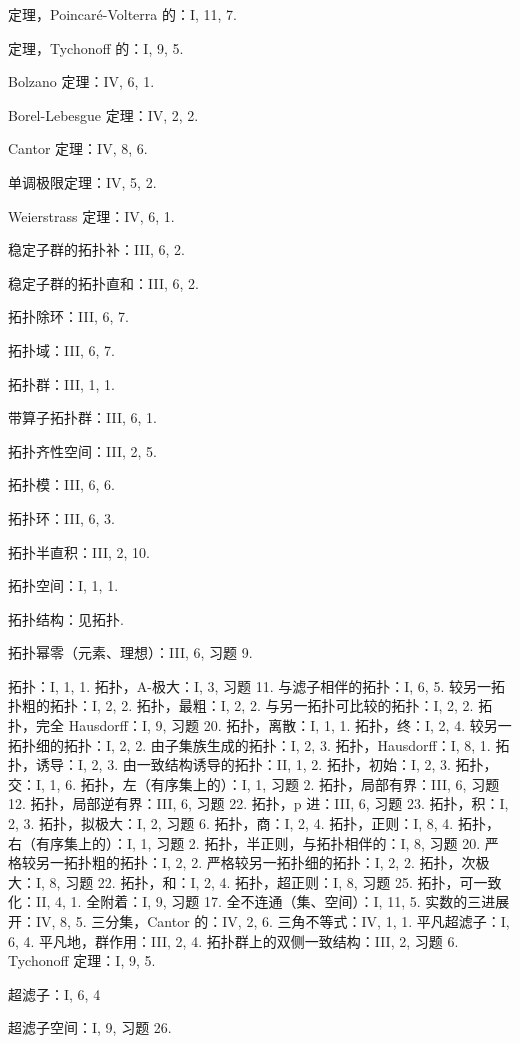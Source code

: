 定理，Poincaré-Volterra 的：I, 11, 7.

定理，Tychonoff 的：I, 9, 5.

Bolzano 定理：IV, 6, 1.

Borel-Lebesgue 定理：IV, 2, 2.

Cantor 定理：IV, 8, 6.

单调极限定理：IV, 5, 2.

Weierstrass 定理：IV, 6, 1.

稳定子群的拓扑补：III, 6, 2.

稳定子群的拓扑直和：III, 6, 2.

拓扑除环：III, 6, 7.

拓扑域：III, 6, 7.

拓扑群：III, 1, 1.

带算子拓扑群：III, 6, 1.

拓扑齐性空间：III, 2, 5.

拓扑模：III, 6, 6.

拓扑环：III, 6, 3.

拓扑半直积：III, 2, 10.

拓扑空间：I, 1, 1.

拓扑结构：见拓扑.

拓扑幂零（元素、理想）：III, 6, 习题 9.

拓扑：I, 1, 1. 拓扑，A-极大：I, 3, 习题 11. 与滤子相伴的拓扑：I, 6, 5. 较另一拓扑粗的拓扑：I, 2, 2. 拓扑，最粗：I, 2, 2. 与另一拓扑可比较的拓扑：I, 2, 2. 拓扑，完全 Hausdorff：I, 9, 习题 20. 拓扑，离散：I, 1, 1. 拓扑，终：I, 2, 4. 较另一拓扑细的拓扑：I, 2, 2. 由子集族生成的拓扑：I, 2, 3. 拓扑，Hausdorff：I, 8, 1. 拓扑，诱导：I, 2, 3. 由一致结构诱导的拓扑：II, 1, 2. 拓扑，初始：I, 2, 3. 拓扑，交：I, 1, 6. 拓扑，左（有序集上的）：I, 1, 习题 2. 拓扑，局部有界：III, 6, 习题 12. 拓扑，局部逆有界：III, 6, 习题 22. 拓扑，p 进：III, 6, 习题 23. 拓扑，积：I, 2, 3. 拓扑，拟极大：I, 2, 习题 6. 拓扑，商：I, 2, 4. 拓扑，正则：I, 8, 4. 拓扑，右（有序集上的）：I, 1, 习题 2. 拓扑，半正则，与拓扑相伴的：I, 8, 习题 20. 严格较另一拓扑粗的拓扑：I, 2, 2. 严格较另一拓扑细的拓扑：I, 2, 2. 拓扑，次极大：I, 8, 习题 22. 拓扑，和：I, 2, 4. 拓扑，超正则：I, 8, 习题 25. 拓扑，可一致化：II, 4, 1. 全附着：I, 9, 习题 17. 全不连通（集、空间）：I, 11, 5. 实数的三进展开：IV, 8, 5. 三分集，Cantor 的：IV, 2, 6. 三角不等式：IV, 1, 1. 平凡超滤子：I, 6, 4. 平凡地，群作用：III, 2, 4. 拓扑群上的双侧一致结构：III, 2, 习题 6. Tychonoff 定理：I, 9, 5.

超滤子：I, 6, 4

超滤子空间：I, 9, 习题 26.

